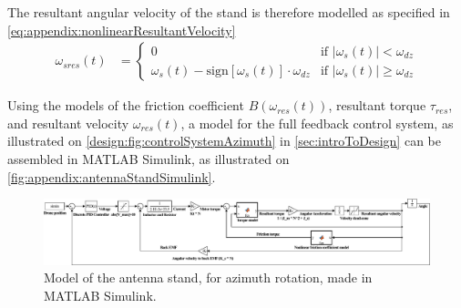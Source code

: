 The resultant angular velocity of the stand is therefore modelled as specified in \autoref{eq:appendix:nonlinearResultantVelocity}
\begin{align} \label{eq:appendix:nonlinearResultantVelocity}
\omega_{sres}(t) &=
  \begin{cases}
	0   		& \text{if } \left| \omega_s(t) \right | < \omega_{dz} \\
	\omega_s(t) - \text{sign}[\omega_s(t)] \cdot \omega_{dz}		& \text{if } \left| \omega_s(t) \right | \geq \omega_{dz}
  \end{cases}
\end{align}
\startexplain
{}
\stopexplain

Using the models of the friction coefficient $B(\omega_{res}(t))$, resultant torque $\tau_{res}$, and resultant velocity $\omega_{res}(t)$, a model for the full feedback control system, as illustrated on \autoref{design:fig:controlSystemAzimuth} in \autoref{sec:introToDesign} can be assembled in MATLAB Simulink, as illustrated on \autoref{fig:appendix:antennaStandSimulink}.

\begin{figure}[p]
	\centering
	\includegraphics[width=\textheight+100pt, angle=90]{figures/appendix/nonlinearStandModel/antennaStandSimulink}
	\caption{Model of the antenna stand, for azimuth rotation, made in MATLAB Simulink.}
	\label{fig:appendix:antennaStandSimulink}
\end{figure}
